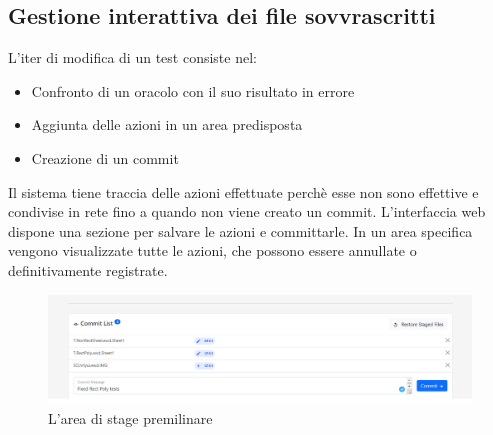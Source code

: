         \subsection{Gestione interattiva dei file sovvrascritti}
            L'iter di modifica di un test consiste nel: 
            \begin{itemize}
                \item Confronto di un oracolo con il suo risultato in errore
                \item Aggiunta delle azioni in un area predisposta
                \item Creazione di un commit
            \end{itemize}      
            Il sistema tiene traccia delle azioni effettuate perchè esse non sono effettive e condivise in rete fino a quando non viene creato un commit.
            L'interfaccia web dispone una sezione per salvare le azioni e committarle.
            In un area specifica vengono visualizzate tutte le azioni, che possono essere annullate o definitivamente registrate.
            \begin{figure}[h!]
                \includegraphics[width=\textwidth]{images/commit list.png}
                \caption{L'area di stage premilinare}
            \end{figure}
